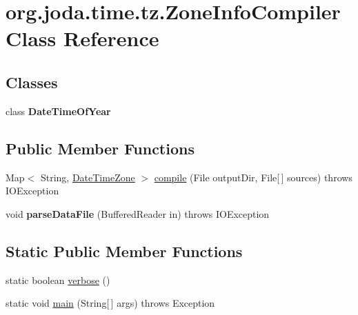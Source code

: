 \hypertarget{classorg_1_1joda_1_1time_1_1tz_1_1_zone_info_compiler}{\section{org.\-joda.\-time.\-tz.\-Zone\-Info\-Compiler Class Reference}
\label{classorg_1_1joda_1_1time_1_1tz_1_1_zone_info_compiler}
}
\subsection*{Classes}
\begin{DoxyCompactItemize}
\item 
class {\bfseries Date\-Time\-Of\-Year}
\end{DoxyCompactItemize}
\subsection*{Public Member Functions}
\begin{DoxyCompactItemize}
\item 
Map$<$ String, \hyperlink{classorg_1_1joda_1_1time_1_1_date_time_zone}{Date\-Time\-Zone} $>$ \hyperlink{classorg_1_1joda_1_1time_1_1tz_1_1_zone_info_compiler_aa4328ffdef75e7002382ed8a4629b5e2}{compile} (File output\-Dir, File\mbox{[}$\,$\mbox{]} sources)  throws I\-O\-Exception 
\item 
\hypertarget{classorg_1_1joda_1_1time_1_1tz_1_1_zone_info_compiler_a0284478a9fdd239fbe9275be4c432d41}{void {\bfseries parse\-Data\-File} (Buffered\-Reader in)  throws I\-O\-Exception }\label{classorg_1_1joda_1_1time_1_1tz_1_1_zone_info_compiler_a0284478a9fdd239fbe9275be4c432d41}

\end{DoxyCompactItemize}
\subsection*{Static Public Member Functions}
\begin{DoxyCompactItemize}
\item 
static boolean \hyperlink{classorg_1_1joda_1_1time_1_1tz_1_1_zone_info_compiler_a3c3a72aac0953d54be4bf1e948f26178}{verbose} ()
\item 
static void \hyperlink{classorg_1_1joda_1_1time_1_1tz_1_1_zone_info_compiler_abcf4f4cd16e6365e84c9225f7aa230c2}{main} (String\mbox{[}$\,$\mbox{]} args)  throws Exception 
\end{DoxyCompactItemize}


